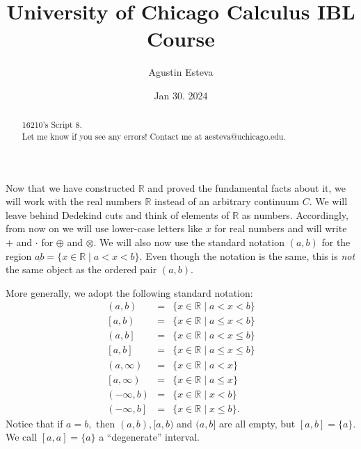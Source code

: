 \documentclass[openany, amssymb, psamsfonts]{amsart}
\title{University of Chicago Calculus IBL Course}
\author{Agustin Esteva}
\date{Jan 30. 2024}
\newcommand{\bbR}{\mathbb{R}}
\theoremstyle{definition}
\numberwithin{equation}{section}
\begin{document}
\begin{abstract}

16210's Script 8.\\ Let me know if you see any errors! Contact me at aesteva@uchicago.edu.


\end{abstract}

\maketitle

\tableofcontents

\setcounter{section}{8}
Now that we have constructed $\bbR$ and proved the fundamental facts about it, we will  work with the real numbers $\bbR$ instead of an arbitrary continuum $C$. We will leave behind Dedekind cuts and think of elements of $\bbR$ as numbers. Accordingly,  from now on we will use lower-case letters like $x$ for real numbers and will write $+$ and $\cdot$ for $\oplus$ and $\otimes$. We will also now use the standard notation $(a, b)$ for the region $\underline{ab} = \{x \in \bbR \mid a < x < b\}$. Even though the notation is the same, this is \emph{not} the same object as the ordered pair $(a, b)$.

More generally, we adopt the following standard notation:
\begin{eqnarray}
(a, b) & = & \{x\in \bbR\mid a<x<b\} \nonumber \\
\left[a,b\right)  & = & \{x\in \bbR\mid a\leq x<b\} \nonumber\\
\left(a,b\right] & =& \{x\in \bbR\mid a<x\leq b\}  \nonumber  \\
\left[a,b\right] & =& \{x\in \bbR\mid a\leq x\leq b\}  \nonumber\\
\left(a,\infty\right) & =& \{x\in \bbR\mid a<x\} \nonumber  \\
\left[a,\infty\right) & =& \{x\in \bbR\mid a\leq x\} \nonumber  \\
\left(-\infty,b\right) & =& \{x\in \bbR\mid x<b\} \nonumber  \\
\left(-\infty, b\right] & = & \{x\in \bbR\mid x\leq b\} \nonumber .
\end{eqnarray}
Notice that if $a=b,$ then $(a,b), [a,b)$ and $(a,b]$ are all empty, but $[a,b]=\{a\}.$ We call $[a,a]=\{a\}$ a ``degenerate'' interval.
\end{document}
